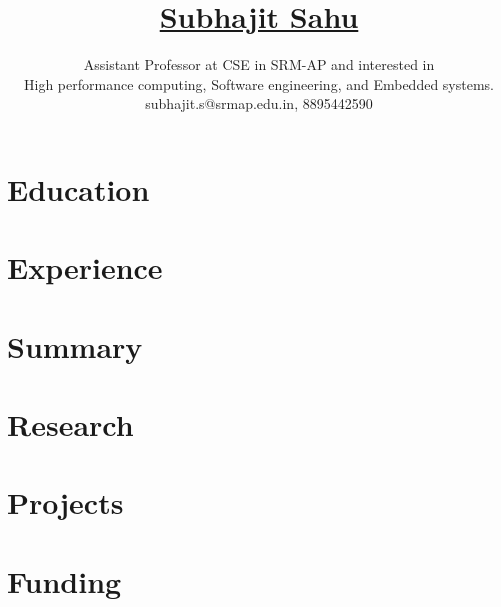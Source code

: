 \documentclass[11pt]{article}
\title{
  \vspace{-6ex}
  \href{https://orcid.org/0000-0001-5140-6578}{Subhajit Sahu}
  \vspace{-4ex}
}
\author{
  Assistant Professor at CSE in SRM-AP and interested in \\
  High performance computing, Software engineering, and Embedded systems. \\
  {\small subhajit.s@srmap.edu.in, 8895442590} \\
}
\date{}
\begin{document}
\maketitle
\vspace{-9ex}

\section{Education}


\section{Experience}


\section{Summary}


\section{Research}


\section{Projects}


\section{Funding}

\end{document}
